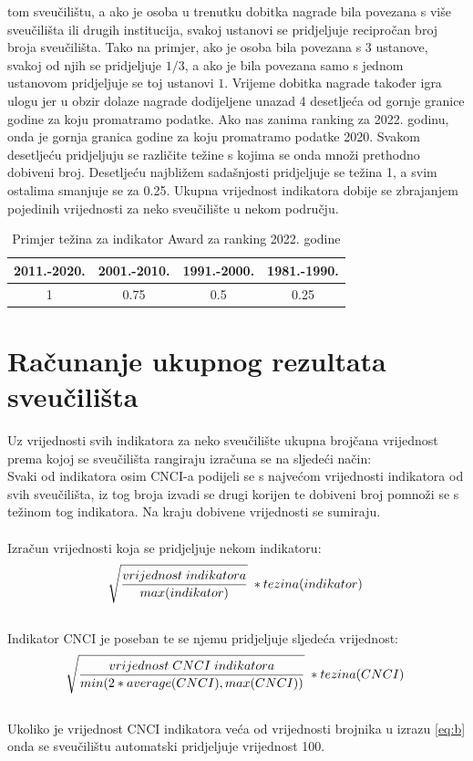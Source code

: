 \documentclass[times, utf8, zavrsni]{fer}
\begin{document}
tom sveučilištu, a ako  je osoba u trenutku dobitka nagrade bila povezana s više sveučilišta ili drugih institucija, svakoj ustanovi se pridjeljuje
recipročan broj broja sveučilišta. Tako na primjer, ako je osoba bila povezana s 3 ustanove, svakoj od njih se pridjeljuje $1/3$, a ako je bila 
povezana samo s jednom ustanovom pridjeljuje se toj ustanovi $1$. 
Vrijeme dobitka nagrade također igra ulogu jer u obzir dolaze nagrade dodijeljene unazad 4 desetljeća od gornje granice godine za koju promatramo podatke.
Ako nas zanima ranking za 2022. godinu, onda je gornja granica godine za koju promatramo podatke 2020. Svakom desetljeću pridjeljuju se različite težine 
s kojima se onda množi prethodno dobiveni broj. Desetljeću najbližem sadašnjosti pridjeljuje se težina 1, a svim ostalima smanjuje se za 0.25.
Ukupna vrijednost indikatora dobije se zbrajanjem pojedinih vrijednosti za neko sveučilište u nekom području.

\begin{table}[htb]
    \caption{Primjer težina za indikator Award za ranking 2022. godine}
        \label{tbl:konstante2}
        \centering
        \begin{tabular}{cccc} \hline
        2011.-2020. & 2001.-2010. & 1991.-2000. & 1981.-1990.\\ \hline
        1&0.75&0.5&0.25\\
        \end{tabular}
        \end{table}    
        \FloatBarrier
\newpage
\section{Računanje ukupnog rezultata sveučilišta}
Uz vrijednosti svih indikatora za neko sveučilište ukupna brojčana vrijednost prema kojoj se sveučilišta rangiraju izračuna 
se na sljedeći način:
\\Svaki od indikatora osim CNCI-a podijeli se s najvećom vrijednosti indikatora od svih sveučilišta, iz tog broja izvadi se
drugi korijen te dobiveni broj pomnoži se s težinom tog indikatora.
Na kraju dobivene vrijednosti se sumiraju.
\\
\\ Izračun vrijednosti koja se pridjeljuje nekom indikatoru: 
\begin{align}
    \sqrt[\leftroot{-2}]{\frac{vrijednost \; indikatora}{max(indikator)}} \; * tezina(indikator) \label{eq:a}
\end{align}
\\ Indikator CNCI je poseban te se njemu pridjeljuje sljedeća vrijednost: \\ 
\begin{align}
    \sqrt[\leftroot{-2}]{\frac{vrijednost \; CNCI \; indikatora}{min(2*average(CNCI), max(CNCI))}} \; * tezina(CNCI) \label{eq:b}
    \end{align}
\\ Ukoliko je vrijednost CNCI indikatora veća od vrijednosti brojnika u izrazu \ref{eq:b} onda se sveučilištu automatski pridjeljuje vrijednost 100.
\end{document}
